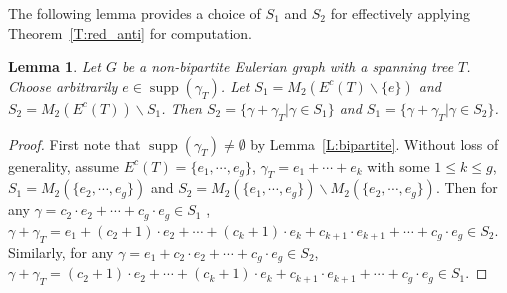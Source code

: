 \documentclass[11pt]{amsart}
\renewcommand{\setminus}{\mathbin{\backslash}}%
\theoremstyle{plain}
\newtheorem{lemma}[theorem]{Lemma}
\theoremstyle{definition}
\DeclareMathOperator{\supp}{\operatorname{supp}}
\numberwithin{equation}{section}
\begin{document}
The following lemma provides a choice of $S_1$ and $S_2$ for effectively applying Theorem~\ref{T:red_anti} for computation. 
\begin{lemma}
Let $G$ be a non-bipartite Eulerian graph with a spanning tree $T$. Choose arbitrarily $e\in \supp(\gamma_T)$. Let $S_1=M_2(E^c(T)\setminus \{e\})$ and $S_2=M_2(E^c(T))\setminus S_1$. Then $S_2=\{\gamma+\gamma_T|\gamma\in S_1\}$ and $S_1=\{\gamma+\gamma_T|\gamma\in S_2\}$. 
\end{lemma}
\begin{proof}
First note that $\supp(\gamma_T)\neq\emptyset$ by Lemma~\ref{L:bipartite}. Without loss of generality, assume $E^c(T)=\{e_1,\cdots,e_g\}$, $\gamma_T = e_1+\cdots+e_k$ with some $1\leq k\leq g$, $S_1 = M_2(\{e_2,\cdots, e_g\})$ and $S_2 = M_2(\{e_1,\cdots, e_g\})\setminus M_2(\{e_2,\cdots, e_g\})$. Then for any $\gamma = c_2\cdot e_2+\cdots+c_g\cdot e_g\in S_1$ , $\gamma+\gamma_T=e_1+(c_2+1)\cdot e_2+\cdots +(c_k+1)\cdot e_k+c_{k+1}\cdot e_{k+1}+\cdots +c_g\cdot e_g\in S_2$. Similarly, for any $\gamma = e_1+c_2\cdot e_2+\cdots+c_g\cdot e_g\in S_2$, $\gamma+\gamma_T=(c_2+1)\cdot e_2+\cdots+(c_k+1)\cdot e_k+c_{k+1}\cdot e_{k+1}+\cdots +c_g\cdot e_g\in S_1$.
\end{proof}
\end{document}
